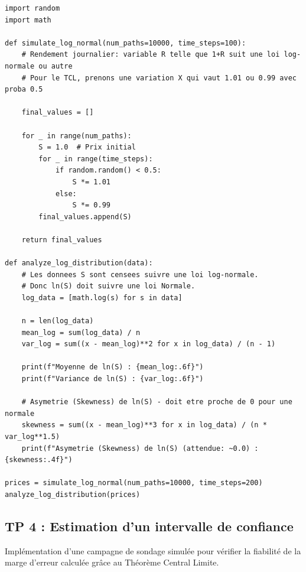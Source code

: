 \documentclass[11pt,a4paper]{article}
\begin{document}
\begin{lstlisting}
import random
import math

def simulate_log_normal(num_paths=10000, time_steps=100):
    # Rendement journalier: variable R telle que 1+R suit une loi log-normale ou autre
    # Pour le TCL, prenons une variation X qui vaut 1.01 ou 0.99 avec proba 0.5

    final_values = []

    for _ in range(num_paths):
        S = 1.0  # Prix initial
        for _ in range(time_steps):
            if random.random() < 0.5:
                S *= 1.01
            else:
                S *= 0.99
        final_values.append(S)

    return final_values

def analyze_log_distribution(data):
    # Les donnees S sont censees suivre une loi log-normale.
    # Donc ln(S) doit suivre une loi Normale.
    log_data = [math.log(s) for s in data]

    n = len(log_data)
    mean_log = sum(log_data) / n
    var_log = sum((x - mean_log)**2 for x in log_data) / (n - 1)

    print(f"Moyenne de ln(S) : {mean_log:.6f}")
    print(f"Variance de ln(S) : {var_log:.6f}")

    # Asymetrie (Skewness) de ln(S) - doit etre proche de 0 pour une normale
    skewness = sum((x - mean_log)**3 for x in log_data) / (n * var_log**1.5)
    print(f"Asymetrie (Skewness) de ln(S) (attendue: ~0.0) : {skewness:.4f}")

prices = simulate_log_normal(num_paths=10000, time_steps=200)
analyze_log_distribution(prices)
\end{lstlisting}


\vspace{1cm}
\subsection*{TP 4 : Estimation d'un intervalle de confiance}

Implémentation d'une campagne de sondage simulée pour vérifier la fiabilité de la marge d'erreur calculée grâce au Théorème Central Limite.
\end{document}
